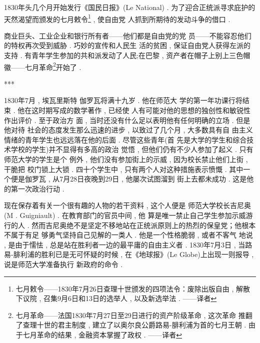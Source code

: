 1830年头几个月开始发行《国民日报》(Le National) . 为了迎合正统派寻求庇护的天然渴望而颁发的七月敕令\footnote{七月敕令——1830年7月26日查理十世颁发的四项法令：废除出版自由 , 解散下议院 , 召集9月6日和13日的选举人 , 以及新选举法 . ——译者} , 使自由党 人抓到所期待的发动斗争的借口 . 

商业巨头、工业企业和银行所有者——他们都是自由党的党 员——不能容忍他们的特权再次受到威胁 . 巧妙的宣传和人民生 活的贫困 , 保证自由党人获得左派的支持 . 有青年学生参加的共和派发动了人民;在巴黎 , 资产者在帽子上别上三色帽徽——七月革命\footnote{七月革命——法国1830年7月27日至29日进行的资产阶级革命 , 这次革命 推翻了查理十世的君主制度 , 建立了以奥尔良公爵路易-腓利浦为首的七月王朝 . 由于七月革命的结果 , 金融资本掌握了政权 . ——译者}开始了 . 

\begin{center}***
\end{center}

1830年7月 , 埃瓦里斯特 \textbullet 伽罗瓦将满十九岁 . 他在师范大 学的第一年功课行将结束 . 他在这时期写成的数学著作 , 已经使 人有可能对他的思想的独创性和敏锐性作出评价 . 至于政治方 面 , 当时还没有什么足以表明他有任何明确的立场 . 但是他对待 社会的态度发生那么迅速的进步 , 以致过了几个月 , 大多数具有自 由主义情绪的青年学生也远远落在他的后面 . 尽管这些青年(首 先是大学的学生和综合技术学校的学生)并不显得有多高的政治 觉悟 , 但他们仍有不少人参加了起义 . 只有师范大学的学生是个 例外 , 他们没有参加街上的示威 , 因为校长禁止他们上街 , 干脆把 校门锁上大锁 . 四十个学生中 , 只有两个人对这种措施表示愤慨 .  其中一个便是伽罗瓦 , 从7月28日夜晚到29日 , 他屡次试图溜到 街上去都未成功 . 这是他的第一次政治行动 . 

现在保存着有关一个很有趣的人物的若干资料 , 这个人便是 师范大学校长吉尼奥(M .  Guigniault) . 在教育部门的官员中间 , 他 算是唯一禁止自己学生参加示威游行的人 . 然而吉尼奥绝不是坚定不移地站在正统派原则上的热烈的保皇党；他根本不属于有足 够勇气坚持自己见解的一类人 . 他是一个性格脆弱 , 或者不客气 地说 , 是由于懦怯 , 总是站在胜利者一边的最平庸的自由主义者 .  1830年7月3日 , 当路易-腓利浦的胜利已是无可怀疑的时候 ,  在《地球报》(Le Globe)上出现一则报导 , 说是师范大学准备执行 新政府的命令 . 

